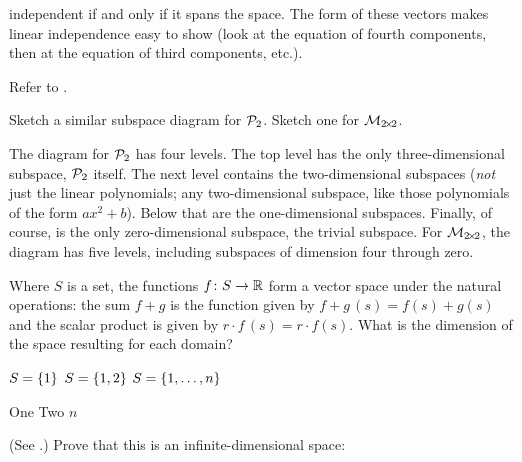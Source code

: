 \begin{exercises}
\begin{answer}
       independent if and only if it spans the space.
       The form of these vectors makes linear independence easy to show
       (look at the equation of fourth components, then at the equation of 
       third components, etc.).  
    \end{answer}
  \item 
     Refer to .
     \begin{exparts}
       \partsitem Sketch a similar subspace diagram for $\mathcal{P}_2$.
       \partsitem Sketch one for $\mathcal{M}_{2 \! \times \! 2}$.
     \end{exparts}
     \begin{answer}
      \begin{exparts}
       \partsitem The diagram for $\mathcal{P}_2$ has four levels.
          The top level has the only three-dimensional subspace, 
          $\mathcal{P}_2$ itself.
          The next level contains the two-dimensional subspaces
          (\emph{not} just the linear polynomials; any two-dimensional
          subspace, like those polynomials of the form $ax^2+b$).
          Below that are the one-dimensional subspaces.
          Finally, of course, is the only zero-dimensional subspace,
          the trivial subspace.
        \partsitem For $\mathcal{M}_{2 \! \times \! 2}$, the diagram has five levels,
          including subspaces of dimension four through zero.
     \end{exparts}
    \end{answer}
  \recommended \item \label{exer:DimDomToR}
    Where \( S \) is a set, the functions
    \( \mbox{$f\colon S\to \mathbb{R}$} \) form a vector space under the natural operations:
    the sum $f+g$ is the function given by 
    \( f+g\,(s)=f(s)+g(s) \) and the scalar product is given by
    \( r\cdot f \, (s)=r\cdot f(s) \).
    What is the dimension of the space resulting for each domain?
    \begin{exparts*}
      \partsitem \( S=\mbox{$\{1\}$} \)
      \partsitem \( S=\mbox{$\{1,2\}$} \)
      \partsitem \( S=\mbox{$\{1,\ldots,n\}$} \)
    \end{exparts*}
    \begin{answer}
      \begin{exparts*}
        \partsitem One
        \partsitem Two
        \partsitem \( n \)
      \end{exparts*}  
    \end{answer}
  \item  
    (See .)
    Prove that this is an infinite-dimensional space:

\end{exercises}
